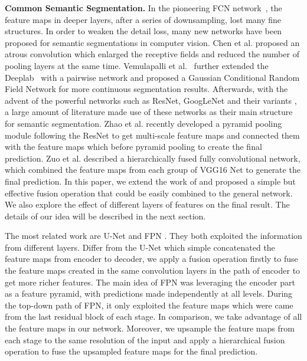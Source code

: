 \noindent\textbf{Common Semantic Segmentation.}
In the pioneering FCN network~\cite{IEEEexample:Long_2015_CVPR}, the feature maps in deeper layers, after a series of downsampling, lost many fine structures.
In order to weaken the detail loss, many new networks have been proposed for semantic segmentations in computer vision.
%
Chen et al.\cite{IEEEexample:chen2016deeplab} proposed an atrous  convolution which enlarged the receptive fields and reduced the number of pooling layers at the same time.
Vemulapalli et al.~\cite{IEEEexample:vemulapalli2016gaussian} further extended the Deeplab~\cite{IEEEexample:chen2016deeplab} with a pairwise network and proposed a Gaussian Conditional Random Field Network for more continuous segmentation results.
 Afterwards, with the advent of the powerful networks such as ResNet\cite{IEEEexample:he2016deep}, GoogLeNet\cite{IEEEexample:szegedy2015going} and their variants \cite{IEEEexample:szegedy2016rethinking}\cite{IEEEexample:szegedy2017inception}\cite{IEEEexample:xie2017aggregated}, a large amount of literature made use of these networks as their main structure for semantic segmentation.
 Zhao et al.\cite{IEEEexample:zhao2017contextually} recently developed a pyramid pooling module following the ResNet\cite{IEEEexample:he2016deep} to get multi-scale feature maps and connected them with the feature maps which before pyramid pooling to create the final prediction.
 Zuo et al.\cite{IEEEexample:zuo2016hf} described a hierarchically fused fully convolutional network, which combined the feature maps from each group of VGG16 Net to generate the final prediction.
 In this paper, we extend the work of\cite{IEEEexample:zuo2016hf} and proposed a simple but effective fusion operation that could be easily combined to the general network.
 We also explore the effect of different layers of features on the final result. The details of our idea will be described in the next section.


The most related work are U-Net\cite{IEEEexample:ronneberger2015u} and FPN \cite{IEEEexample:lin2017feature}. They both exploited the information from different layers. Differ from the U-Net which simple concatenated the feature maps from encoder to decoder, we apply a fusion operation firstly to fuse the feature maps created in the same convolution layers in the path of encoder to get more richer features.
The main idea of FPN was leveraging the encoder part as a feature pyramid, with predictions made independently at all levels. During the top-down path of FPN, it only exploited the feature maps which were came from the last residual block of each stage.
In comparison, we take advantage of all the feature maps in our network. Moreover, we upsample the feature maps from each stage to the same resolution of the input and apply a hierarchical fusion operation to fuse the upsampled feature maps for the final prediction.%








